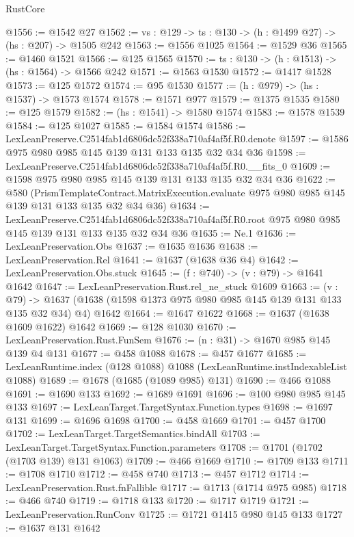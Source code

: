 \begin{lexlean}{RustCore}
\begin{coremodule}
@1556 := @1542 @27
@1562 := {vs : @129} -> {ts : @130} -> (h : @1499 @27) -> (hs : @207) -> @1505 @242
@1563 := @1556 @1025
@1564 := @1529 @36
@1565 := @1460 @1521
@1566 := @125 @1565
@1570 := {ts : @130} -> (h : @1513) -> (hs : @1564) -> @1566 @242
@1571 := @1563 @1530
@1572 := @1417 @1528
@1573 := @125 @1572
@1574 := @95 @1530
@1577 := (h : @979) -> (hs : @1537) -> @1573 @1574
@1578 := @1571 @977
@1579 := @1375 @1535
@1580 := @125 @1579
@1582 := (hs : @1541) -> @1580 @1574
@1583 := @1578 @1539
@1584 := @125 @1027
@1585 := @1584 @1574
@1586 := LexLeanPreserve.C2514fab1d6806dc52f338a710af4af5f.R0.denote
@1597 := @1586 @975 @980 @985 @145 @139 @131 @133 @135 @32 @34 @36
@1598 := LexLeanPreserve.C2514fab1d6806dc52f338a710af4af5f.R0.__fits_0
@1609 := @1598 @975 @980 @985 @145 @139 @131 @133 @135 @32 @34 @36
@1622 := @580
    (PrismTemplateContract.MatrixExecution.evaluate
      @975
      @980
      @985
      @145
      @139
      @131
      @133
      @135
      @32
      @34
      @36)
@1634 := LexLeanPreserve.C2514fab1d6806dc52f338a710af4af5f.R0.root
    @975
    @980
    @985
    @145
    @139
    @131
    @133
    @135
    @32
    @34
    @36
@1635 := Ne.{1}
@1636 := LexLeanPreservation.Obs
@1637 := @1635 @1636
@1638 := LexLeanPreservation.Rel
@1641 := @1637 (@1638 @36 @4)
@1642 := LexLeanPreservation.Obs.stuck
@1645 := (f : @740) -> (v : @79) -> @1641 @1642
@1647 := LexLeanPreservation.Rust.rel_ne_stuck @1609
@1663 := (v : @79) ->
  @1637 (@1638 (@1598 @1373 @975 @980 @985 @145 @139 @131 @133 @135 @32 @34) @4) @1642
@1664 := @1647 @1622
@1668 := @1637 (@1638 @1609 @1622) @1642
@1669 := @128 @1030
@1670 := LexLeanPreservation.Rust.FunSem
@1676 := (n : @31) -> @1670 @985 @145 @139 @4 @131
@1677 := @458 @1088
@1678 := @457 @1677
@1685 := LexLeanRuntime.index (@128 @1088) @1088 (LexLeanRuntime.instIndexableList @1088)
@1689 := @1678 (@1685 (@1089 @985) @131)
@1690 := @466 @1088
@1691 := @1690 @133
@1692 := @1689 @1691
@1696 := @100 @980 @985 @145 @133
@1697 := LexLeanTarget.TargetSyntax.Function.types
@1698 := @1697 @131
@1699 := @1696 @1698
@1700 := @458 @1669
@1701 := @457 @1700
@1702 := LexLeanTarget.TargetSemantics.bindAll
@1703 := LexLeanTarget.TargetSyntax.Function.parameters
@1708 := @1701 (@1702 (@1703 @139) @131 @1063)
@1709 := @466 @1669
@1710 := @1709 @133
@1711 := @1708 @1710
@1712 := @458 @740
@1713 := @457 @1712
@1714 := LexLeanPreservation.Rust.fnFallible
@1717 := @1713 (@1714 @975 @985)
@1718 := @466 @740
@1719 := @1718 @133
@1720 := @1717 @1719
@1721 := LexLeanPreservation.RunConv
@1725 := @1721 @1415 @980 @145 @133
@1727 := @1637 @131 @1642

\end{coremodule}
\end{lexlean}
